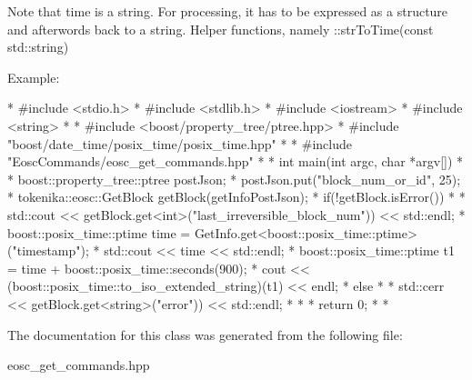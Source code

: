 Note that time is a string. For processing, it has to be expressed as a structure and afterwords back to a string. Helper functions, namely \+::str\+To\+Time(const std\+::string)

Example\+:

\begin{DoxyVerb}* #include <stdio.h>
* #include <stdlib.h>
* #include <iostream>
* #include <string>
* 
* #include <boost/property_tree/ptree.hpp>
* #include "boost/date_time/posix_time/posix_time.hpp"
* 
* #include "EoscCommands/eosc_get_commands.hpp"  
* 
* int main(int argc, char *argv[])
* {
* boost::property_tree::ptree postJson;
* postJson.put("block_num_or_id", 25);
* tokenika::eosc::GetBlock getBlock(getInfoPostJson);
* if(!getBlock.isError())
* {
*    std::cout << getBlock.get<int>("last_irreversible_block_num")) << std::endl;
*    boost::posix_time::ptime time = GetInfo.get<boost::posix_time::ptime>("timestamp");
*    std::cout << time << std::endl;
*    boost::posix_time::ptime t1 = time + boost::posix_time::seconds(900);
*    cout << (boost::posix_time::to_iso_extended_string)(t1) << endl;
* } else
* {
*    std::cerr << getBlock.get<string>("error")) << std::endl;
* }
* 
* return 0;
* }
* \end{DoxyVerb}
 

The documentation for this class was generated from the following file\+:\begin{DoxyCompactItemize}
\item 
eosc\+\_\+get\+\_\+commands.\+hpp\end{DoxyCompactItemize}

